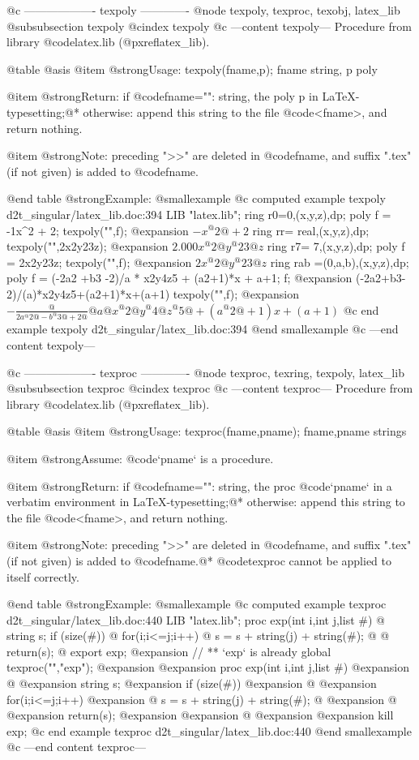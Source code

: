 {{@c ------------------- texpoly -------------
@node texpoly, texproc, texobj, latex_lib
@subsubsection texpoly
@cindex texpoly
@c ---content texpoly---
Procedure from library @code{latex.lib} (@pxref{latex_lib}).

@table @asis
@item @strong{Usage:}
texpoly(fname,p); fname string, p poly

@item @strong{Return:}
if @code{fname=""}: string, the poly p in LaTeX-typesetting;@*
otherwise: append this string to the file @code{<fname>}, and
return nothing.

@item @strong{Note:}
preceding ">>" are deleted in @code{fname}, and suffix ".tex"
(if not given) is added to @code{fname}.

@end table
@strong{Example:}
@smallexample
@c computed example texpoly d2t_singular/latex_lib.doc:394 
LIB "latex.lib";
ring r0=0,(x,y,z),dp;
poly f = -1x^2 + 2;
texpoly("",f);
@expansion{} $-x^@{2@}+2$
ring rr= real,(x,y,z),dp;
texpoly("",2x2y23z);
@expansion{} $2.000x^@{2@}y^@{23@}z$
ring r7= 7,(x,y,z),dp;
poly f = 2x2y23z;
texpoly("",f);
@expansion{} $2x^@{2@}y^@{23@}z$
ring rab =(0,a,b),(x,y,z),dp;
poly f = (-2a2 +b3 -2)/a * x2y4z5 + (a2+1)*x + a+1;
f;
@expansion{} (-2a2+b3-2)/(a)*x2y4z5+(a2+1)*x+(a+1)
texpoly("",f);
@expansion{} $-\frac@{2a^@{2@}-b^@{3@}+2@}@{a@}x^@{2@}y^@{4@}z^@{5@}+(a^@{2@}+1)x+(a+1)$
@c end example texpoly d2t_singular/latex_lib.doc:394
@end smallexample
@c ---end content texpoly---

@c ------------------- texproc -------------
@node texproc, texring, texpoly, latex_lib
@subsubsection texproc
@cindex texproc
@c ---content texproc---
Procedure from library @code{latex.lib} (@pxref{latex_lib}).

@table @asis
@item @strong{Usage:}
texproc(fname,pname); fname,pname strings

@item @strong{Assume:}
@code{`pname`} is a procedure.

@item @strong{Return:}
if @code{fname=""}: string, the proc @code{`pname`} in a verbatim
environment in LaTeX-typesetting;@*
otherwise: append this string to the file @code{<fname>}, and
return nothing.

@item @strong{Note:}
preceding ">>" are deleted in @code{fname}, and suffix ".tex"
(if not given) is added to @code{fname}.@*
@code{texproc} cannot be applied to itself correctly.

@end table
@strong{Example:}
@smallexample
@c computed example texproc d2t_singular/latex_lib.doc:440 
LIB "latex.lib";
proc exp(int i,int j,list #)
@{ string s;
if (size(#))
@{
for(i;i<=j;i++)
@{ s = s + string(j) + string(#); @}
@}
return(s);
@}
export exp;
@expansion{} // ** `exp` is already global
texproc("","exp");
@expansion{} 
@expansion{} proc exp(int i,int j,list #)
@expansion{} @{ 
@expansion{}  string s;
@expansion{} if (size(#))
@expansion{} @{
@expansion{} for(i;i<=j;i++)
@expansion{} @{ s = s + string(j) + string(#); @}
@expansion{} @}
@expansion{} return(s);
@expansion{} 
@expansion{} @}
@expansion{} 
@expansion{} 
kill exp;
@c end example texproc d2t_singular/latex_lib.doc:440
@end smallexample
@c ---end content texproc---

}}
